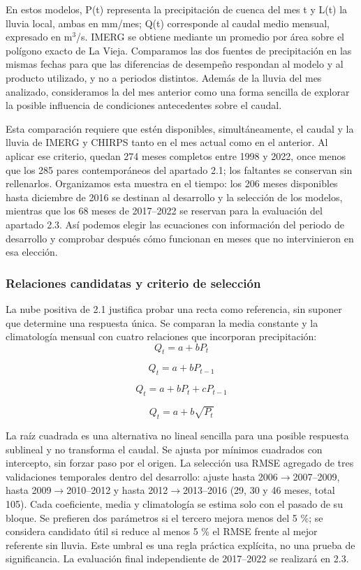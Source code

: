 \documentclass[10pt,a4paper]{article}
\begin{document}
En estos modelos, P(t) representa la precipitación de cuenca del mes t y L(t) la lluvia local, ambas en mm/mes; Q(t) corresponde al caudal medio mensual, expresado en m$^3$/s. IMERG se obtiene mediante un promedio por área sobre el polígono exacto de La Vieja. Comparamos las dos fuentes de precipitación en las mismas fechas para que las diferencias de desempeño respondan al modelo y al producto utilizado, y no a periodos distintos. Además de la lluvia del mes analizado, consideramos la del mes anterior como una forma sencilla de explorar la posible influencia de condiciones antecedentes sobre el caudal.

Esta comparación requiere que estén disponibles, simultáneamente, el caudal y la lluvia de IMERG y CHIRPS tanto en el mes actual como en el anterior. Al aplicar ese criterio, quedan 274 meses completos entre 1998 y 2022, once menos que los 285 pares contemporáneos del apartado 2.1; los faltantes se conservan sin rellenarlos. Organizamos esta muestra en el tiempo: los 206 meses disponibles hasta diciembre de 2016 se destinan al desarrollo y la selección de los modelos, mientras que los 68 meses de 2017--2022 se reservan para la evaluación del apartado 2.3. Así podemos elegir las ecuaciones con información del periodo de desarrollo y comprobar después cómo funcionan en meses que no intervinieron en esa elección.
\begin{samepage}\subsubsection*{Relaciones candidatas y criterio de selección}
La nube positiva de 2.1 justifica probar una recta como referencia, sin suponer que determine una respuesta única. Se comparan la media constante y la climatología mensual con cuatro relaciones que incorporan precipitación:
\begin{equation}
Q_t=a+bP_t
\end{equation}

\begin{equation}
Q_t=a+bP_{t-1}
\end{equation}

\begin{equation}
Q_t=a+bP_t+cP_{t-1}
\end{equation}

\begin{equation}
Q_t=a+b\sqrt{P_t}
\end{equation}
\end{samepage}
 La raíz cuadrada es una alternativa no lineal sencilla para una posible respuesta sublineal y no transforma el caudal. Se ajusta por mínimos cuadrados con intercepto, sin forzar paso por el origen. La selección usa RMSE agregado de tres validaciones temporales dentro del desarrollo: ajuste hasta 2006$\rightarrow$2007--2009, hasta 2009$\rightarrow$2010--2012 y hasta 2012$\rightarrow$2013--2016 (29, 30 y 46 meses, total 105). Cada coeficiente, media y climatología se estima solo con el pasado de su bloque. Se prefieren dos parámetros si el tercero mejora menos del 5 \%; se considera candidato útil si reduce al menos 5 \% el RMSE frente al mejor referente sin lluvia. Este umbral es una regla práctica explícita, no una prueba de significancia. La evaluación final independiente de 2017--2022 se realizará en 2.3.
\end{document}
